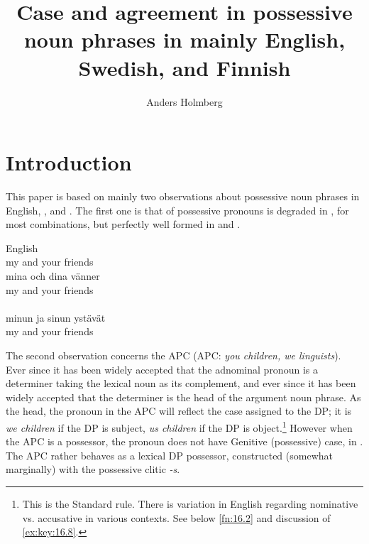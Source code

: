 \documentclass[output=paper]{langsci/langscibook}
\author{Anders Holmberg\affiliation{University of Newcastle}}
\title{Case and agreement in possessive noun phrases in mainly English, Swedish,
and Finnish}
\begin{document}
\glsresetall


\section{Introduction}\label{sec:key:16.1}

This paper is based on mainly two observations about possessive noun phrases in
English, , and . The first one is that  of possessive
pronouns is degraded in , for most combinations, but perfectly well
formed in  and .\newpage

\ea\label{ex:key:16.1}
	\ea English\\
    my and your friends
	\ex {}\\
		\gll mina och dina vänner\\
        my    and your friends\\
    \ex {}\\
		\gll minun ja  sinun ystävät\\
        my and your friends\\
	\z
\z

The second observation concerns the \glsdesc{APC}
(\gls{APC}:
\emph{you children, we linguists}). Ever since \textcite{Postal1969} it has been widely
accepted that the adnominal pronoun is a determiner taking the lexical noun as
its complement, and ever since \citet{Abney1987} it has been widely accepted
that the determiner is the head of the argument noun phrase.  As the head, the
pronoun in the \gls{APC} will reflect the case assigned to the DP; it is
\emph{we children} if the DP is subject, \emph{us children} if the DP is
object.\footnote{ This is the Standard  rule. There is variation in
English regarding nominative vs. accusative in various
contexts. See below \cref{fn:16.2} and discussion of \eqref{ex:key:16.8}.} However when the
\gls{APC} is a possessor, the pronoun does not have Genitive (possessive) case,
in . The \gls{APC} rather behaves as a lexical DP possessor, constructed
(somewhat marginally) with the possessive clitic \emph{-s}.

\ea\label{ex:key:16.2}
	\z
\z
\end{document}
